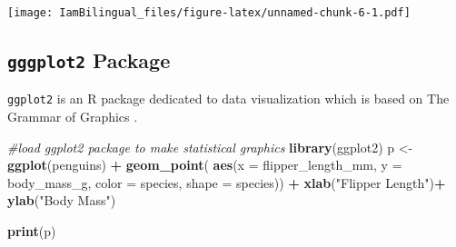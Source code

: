 \documentclass[]{book}
\newenvironment{Shaded}{\begin{snugshade}}{\end{snugshade}}
\newcommand{\CommentTok}[1]{\textcolor[rgb]{0.56,0.35,0.01}{\textit{#1}}}
\newcommand{\DataTypeTok}[1]{\textcolor[rgb]{0.13,0.29,0.53}{#1}}
\newcommand{\DecValTok}[1]{\textcolor[rgb]{0.00,0.00,0.81}{#1}}
\newcommand{\KeywordTok}[1]{\textcolor[rgb]{0.13,0.29,0.53}{\textbf{#1}}}
\newcommand{\NormalTok}[1]{#1}
\newcommand{\OperatorTok}[1]{\textcolor[rgb]{0.81,0.36,0.00}{\textbf{#1}}}
\newcommand{\StringTok}[1]{\textcolor[rgb]{0.31,0.60,0.02}{#1}}
\begin{document}
\begin{Shaded}
\end{Shaded}

\texttt{[image: IamBilingual\_files/figure-latex/unnamed-chunk-6-1.pdf]}

\hypertarget{gggplot2-package}{%
\subsection{\texorpdfstring{\texttt{gggplot2} Package}{gggplot2 Package}}\label{gggplot2-package}}

\texttt{ggplot2} is an R package dedicated to data visualization which is based on The Grammar of Graphics \citep{wilkinson2012grammar}.

\begin{Shaded}
\begin{Highlighting}[]
\CommentTok{#load ggplot2 package to make statistical graphics}
\KeywordTok{library}\NormalTok{(ggplot2)}
\NormalTok{p <-}\StringTok{ }\KeywordTok{ggplot}\NormalTok{(penguins) }\OperatorTok{+}
\StringTok{  }\KeywordTok{geom_point}\NormalTok{( }\KeywordTok{aes}\NormalTok{(}\DataTypeTok{x =}\NormalTok{ flipper_length_mm,}
                  \DataTypeTok{y =}\NormalTok{ body_mass_g,}
                  \DataTypeTok{color =}\NormalTok{ species,}
                  \DataTypeTok{shape =}\NormalTok{ species)) }\OperatorTok{+}
\StringTok{  }\KeywordTok{xlab}\NormalTok{(}\StringTok{"Flipper Length"}\NormalTok{)}\OperatorTok{+}
\StringTok{  }\KeywordTok{ylab}\NormalTok{(}\StringTok{"Body Mass"}\NormalTok{)}

\KeywordTok{print}\NormalTok{(p)}
\end{Highlighting}
\end{Shaded}
\end{document}
